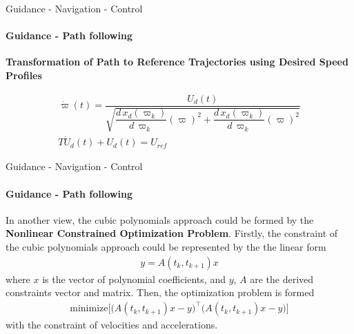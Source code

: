 
\begin{frame}{Guidance - Navigation - Control}
	\framesubtitle{Guidance - Path following}
	\textbf{Transformation of Path to Reference Trajectories using Desired Speed Profiles}
	
	\begin{align}
		\dot{\varpi}(t) = \dfrac{U_d(t)}{\sqrt{\dfrac{d\,x_d(\varpi_{k})}{d\,\varpi_{k}}(\varpi)^2 + \dfrac{d\,x_d(\varpi_{k})}{d\,\varpi_{k}}(\varpi)^2}}\\
		T\dot{U}_d(t) + U_d(t) = U_{ref}
	\end{align}
	
	
\end{frame}




\begin{frame}{Guidance - Navigation - Control}
	\framesubtitle{Guidance - Path following}
	In another view, the cubic polynomials approach could be formed by the \textbf{Nonlinear Constrained Optimization Problem}. Firstly, the constraint of the cubic polynomials approach could be represented by the the linear form
	\begin{align}
		y = A(t_k, t_{k + 1})x
	\end{align}
	where $x$ is the vector of polynomial coefficients, and $y$, $A$ are the derived constraints vector and matrix. Then, the optimization problem is formed
	\begin{align}
		\text{minimize} \Big[\Big(A(t_k, t_{k + 1})x - y\Big)^\top\Big(A(t_k, t_{k + 1})x - y\Big)\Big]
	\end{align}
	with the constraint of velocities and accelerations.
\end{frame}





